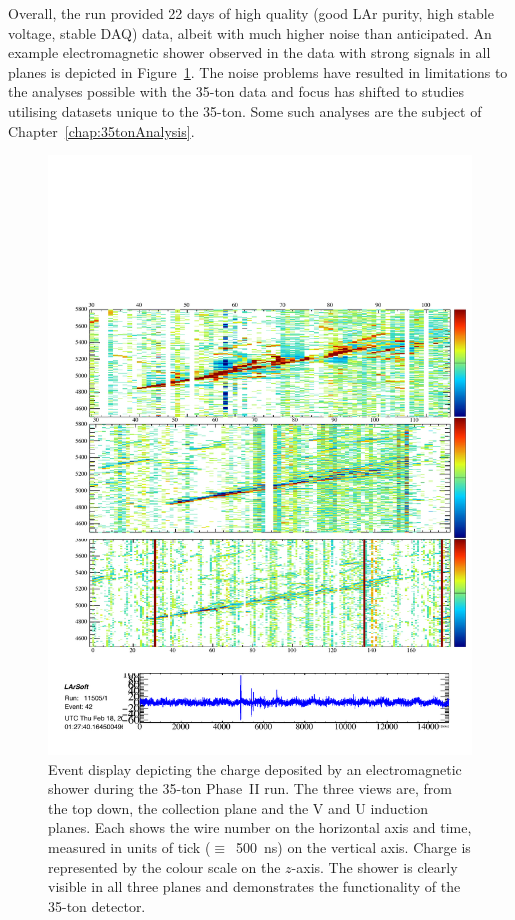 Overall, the run provided 22 days of high quality (good LAr purity, high stable voltage, stable DAQ) data, albeit with much higher noise than anticipated.  An example electromagnetic shower observed in the data with strong signals in all planes is depicted in Figure~\ref{fig:FamousShower}.  The noise problems have resulted in limitations to the analyses possible with the 35-ton data and focus has shifted to studies utilising datasets unique to the 35-ton.  Some such analyses are the subject of Chapter~\ref{chap:35tonAnalysis}.

\begin{figure}
  \centering
  \includegraphics[width=12cm]{FamousShower.pdf}
  \caption[Event display depicting the charge deposited by an electromagnetic shower during the 35-ton Phase~II run.]{Event display depicting the charge deposited by an electromagnetic shower during the 35-ton Phase~II run.  The three views are, from the top down, the collection plane and the V and U induction planes.  Each shows the wire number on the horizontal axis and time, measured in units of tick ($\equiv$~500~ns) on the vertical axis.  Charge is represented by the colour scale on the $z$-axis.  The shower is clearly visible in all three planes and demonstrates the functionality of the 35-ton detector.}
  \label{fig:FamousShower}
\end{figure}

